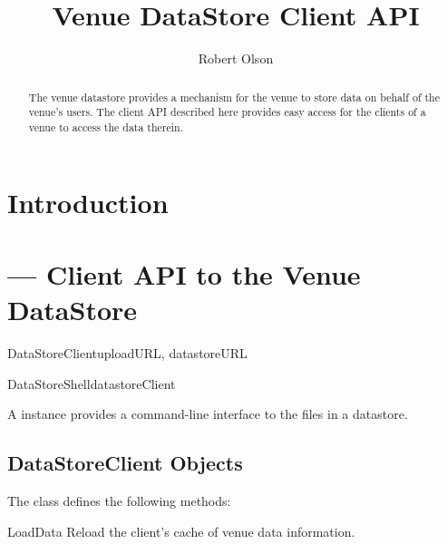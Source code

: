 \documentclass{howto}
\title{Venue DataStore Client API}
\author{Robert Olson}
\begin{document}
\maketitle

\begin{abstract}
\noindent
The venue datastore provides a mechanism for the venue to store data
on behalf of the venue's users. The client API described here provides
easy access for the clients of a venue to access the data therein.
\end{abstract}

\tableofcontents

\section{Introduction \label{intro}}

%
%

\section{ --- Client API to the
Venue DataStore}


\begin{classdesc}{DataStoreClient}{uploadURL, datastoreURL}


\end{classdesc}

\begin{classdesc}{DataStoreShell}{datastoreClient}

A  instance provides a command-line interface to
the files in a datastore.

\end{classdesc}

%
%


\subsection{DataStoreClient Objects}

The  class defines the following methods:

\begin{methoddesc}{LoadData}{}
Reload the client's cache of venue data information.
\end{methoddesc}
\end{document}

